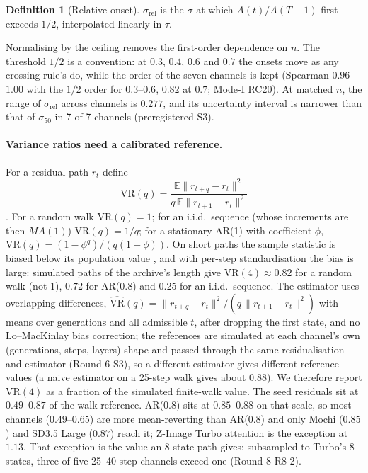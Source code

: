 \documentclass[11pt]{article}
\theoremstyle{definition}
\newtheorem{definition}[theorem]{Definition}
\newcommand{\E}{\mathbb{E}}
\begin{document}
\begin{definition}[Relative onset]
$\sigma_{\mathrm{rel}}$ is the $\sigma$ at which $A(t)/A(T-1)$ first exceeds $1/2$, interpolated linearly in $\tau$.
\end{definition}
Normalising by the ceiling removes the first-order dependence on $n$. The threshold $1/2$ is a convention: at $0.3$, $0.4$, $0.6$ and $0.7$ the onsets move as any crossing rule's do, while the order of the seven channels is kept (Spearman $0.96$--$1.00$ with the $1/2$ order for $0.3$--$0.6$, $0.82$ at $0.7$; Mode-I RC20). At matched $n$, the range of $\sigma_{\mathrm{rel}}$ across channels is $0.277$, and its uncertainty interval is narrower than that of $\sigma_{50}$ in 7 of 7 channels (preregistered S3).

\paragraph{Variance ratios need a calibrated reference.} For a residual path $r_t$ define
\begin{equation}
 \mathrm{VR}(q)=\frac{\E\|r_{t+q}-r_t\|^2}{q\,\E\|r_{t+1}-r_t\|^2}
\end{equation}
\citep{lo1988stock}. For a random walk $\mathrm{VR}(q)=1$; for an i.i.d.\ sequence (whose increments are then $MA(1)$) $\mathrm{VR}(q)=1/q$; for a stationary AR(1) with coefficient $\phi$, $\mathrm{VR}(q)=(1-\phi^q)/(q(1-\phi))$. On short paths the sample statistic is biased below its population value \citep{kim1991mean,lo1989size}, and with per-step standardisation the bias is large: simulated paths of the archive's length give $\mathrm{VR}(4)\approx0.82$ for a random walk (not 1), $0.72$ for AR(0.8) and $0.25$ for an i.i.d.\ sequence. The estimator uses overlapping differences, $\widehat{\mathrm{VR}}(q)=\overline{\|r_{t+q}-r_t\|^2}/(q\,\overline{\|r_{t+1}-r_t\|^2})$ with means over generations and all admissible $t$, after dropping the first state, and no Lo--MacKinlay bias correction; the references are simulated at each channel's own (generations, steps, layers) shape and passed through the same residualisation and estimator (Round 6 S3), so a different estimator gives different reference values (a naive estimator on a 25-step walk gives about $0.88$). We therefore report $\mathrm{VR}(4)$ as a fraction of the simulated finite-walk value. The seed residuals sit at $0.49$--$0.87$ of the walk reference. AR(0.8) sits at $0.85$--$0.88$ on that scale, so most channels ($0.49$--$0.65$) are more mean-reverting than AR(0.8) and only Mochi ($0.85$) and SD3.5 Large ($0.87$) reach it; Z-Image Turbo attention is the exception at $1.13$. That exception is the value an 8-state path gives: subsampled to Turbo's 8 states, three of five 25--40-step channels exceed one (Round 8 R8-2).
\end{document}
